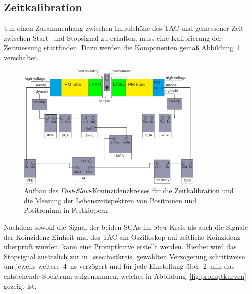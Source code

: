 \documentclass[11pt, a4paper]{article}
\numberwithin{equation}{section}
\begin{document}
\subsection{Zeitkalibration}
Um einen Zusammenhang zwischen Impulshöhe des TAC und gemessener Zeit zwischen Start- und Stopsignal zu erhalten, muss eine Kalibrierung der Zeitmessung stattfinden.
Dazu werden die Komponenten gemäß Abbildung~\ref{fig:fast_slow_coincidence} verschaltet.
\begin{figure}[h]
	\centering
	\includegraphics[width=0.8\textwidth]{./figures/aufbau/zeit.pdf}
	\caption{Aufbau des \textit{Fast}-\textit{Slow}-Koninzidenzkreises für die Zeitkalibration und die Messung der Lebenszeitspektren von Positronen und Positronium in Festkörpern \cite{anleitung}.}
	\label{fig:fast_slow_coincidence}
\end{figure}
Nachdem sowohl die Signal der beiden SCAs im \textit{Slow}-Kreis als auch die Signale der Koinzidenz-Einheit und des TAC am Oszilloskop auf zeitliche Koinzidenz überprüft wurden, kann eine Promptkurve erstellt werden.
Hierbei wird das Stopsignal zusätzlich zur in~\ref{ssec:fastkreis} gewählten Verzögerung schrittweise um jeweils weitere~\SI{4}{ns} verzögert und für jede Einstellung über~\SI{2}{min} das entstehende Spektrum aufgenommen, welches in Abbildung~\ref{fig:promptkurven} gezeigt ist.
\end{document}

